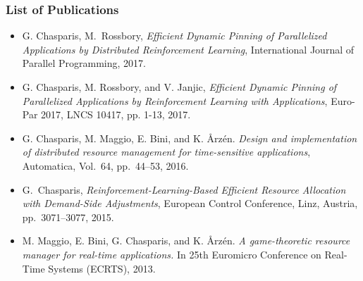 \documentclass[a4paper,11pt]{article}
\begin{document}
\pagebreak
\subsubsection*{List of Publications}

\begin{itemize}

\item G. Chasparis, M.~Rossbory, \textit{Efficient Dynamic Pinning of Parallelized Applications by Distributed Reinforcement Learning}, International Journal of Parallel Programming, 2017.

\item G. Chasparis, M. Rossbory, and V. Janjic, \textit{Efficient Dynamic Pinning of Parallelized Applications by Reinforcement Learning with Applications}, Euro-Par 2017, LNCS 10417, pp. 1-13, 2017.

\item G. Chasparis, M. Maggio, E. Bini, and K. \AA{}rz\'{e}n. \textit{Design and implementation of distributed resource management for time-sensitive applications}, Automatica, Vol.~64, pp.~44--53, 2016.

\item G.~Chasparis, \textit{Reinforcement-Learning-Based Efficient Resource Allocation with Demand-Side Adjustments}, European Control Conference, Linz, Austria, pp.~3071--3077, 2015.



\item M. Maggio, E. Bini, G. Chasparis, and K. \AA{}rz\'{e}n. \textit{A game-theoretic resource manager for real-time applications.} In 25th Euromicro Conference on Real-Time Systems (ECRTS), 2013.



\end{itemize}
\end{document}
